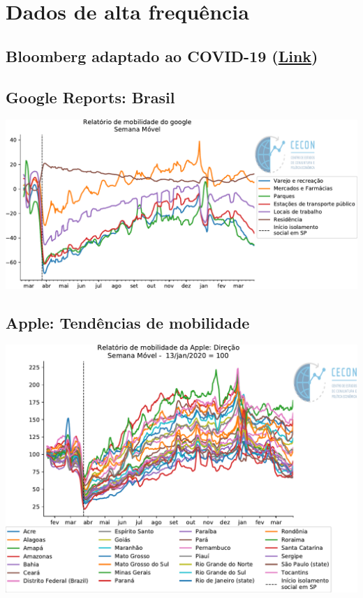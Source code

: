 \documentclass{SelfArx}
\begin{document}
\section*{Dados de alta frequência}
\label{sec:orgd298d35}

\subsection*{Bloomberg adaptado ao COVID-19 (\href{https://www.bloomberg.com/news/articles/2020-11-13/alternative-data-show-activity-crashes-as-virus-resurges-chart}{Link})}
\label{sec:orged363b4}

\subsection*{Google Reports: Brasil}
\label{sec:org808e292}

\begin{center}
\includegraphics[width=.9\linewidth]{./figs/Granulares/GoogleReport_Brasil.pdf}
\end{center}

\subsection*{Apple: Tendências de mobilidade}
\label{sec:orge0c6a95}

\begin{center}
\includegraphics[width=.9\linewidth]{./figs/Granulares/AppleReport_Brasil.pdf}
\end{center}
\end{document}
